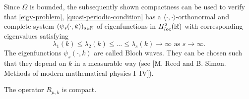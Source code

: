 	Since $\Omega$ is bounded, the subsequently shown compactness can be used to verify that \eqref{eigv-problem}, \eqref{quasi-periodic-condition} has a $\langle \cdot , \cdot \rangle$-orthonormal and complete system $(\psi_{s}(\cdot, k))_{s \in \mathbb{N}}$ of eigenfunctions in $H^{2}_{loc}(\mathbb{R})$ with corresponding eigenvalues satisfying	
	\[ \lambda_{1}(k) \leq \lambda_{2}(k) \leq \dotsc \leq \lambda_{s}(k) \rightarrow \infty \text{ as } s \rightarrow \infty. \]
	The eigenfunctions $\psi_{s}(\cdot, k)$ are called Bloch waves. They can be chosen such that they depend on $k$ in a measurable way (see [M. Reed and B. Simon. Methods of modern mathematical physics I–IV]). %
	
\begin{theorem}
	The operator $R_{\mu, k}$ is compact.


\end{theorem}
